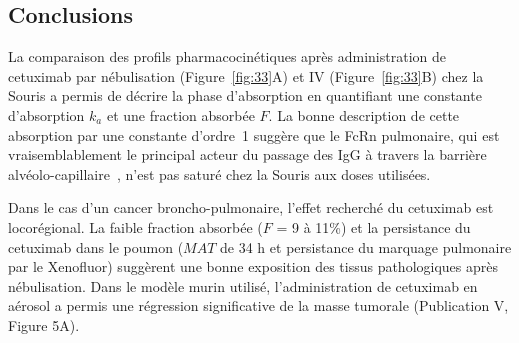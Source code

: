 \subsection{Conclusions}
La comparaison des profils pharmacocinétiques après administration de cetuximab par nébulisation (Figure~\ref{fig:33}A) et \gls{IV} (Figure~\ref{fig:33}B) chez la Souris a permis de décrire la phase d'absorption en quantifiant une constante d'absorption $k_a$ et une fraction absorbée $F$. La bonne description de cette absorption par une constante d'ordre~1 suggère que le FcRn pulmonaire, qui est vraisemblablement le principal acteur du passage des IgG à travers la barrière alvéolo-capillaire~\citep{REF27}, n'est pas saturé chez la Souris aux doses utilisées.

Dans le cas d'un cancer broncho-pulmonaire, l'effet recherché du cetuximab est locorégional. La faible fraction absorbée ($F$ = 9 à 11\%) et la persistance du cetuximab dans le poumon ($MAT$ de 34 h et persistance du marquage pulmonaire par le Xenofluor) suggèrent une bonne exposition des tissus pathologiques après nébulisation. Dans le modèle murin utilisé, l'administration de cetuximab en aérosol a permis une régression significative de la masse tumorale (Publication V, Figure 5A).
